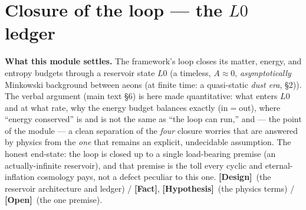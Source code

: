 \documentclass[11pt]{article}
\newcommand{\Fact}{\textbf{\textcolor{green!45!black}{[Fact]}}}
\newcommand{\Hyp}{\textbf{\textcolor{blue!55!black}{[Hypothesis]}}}
\newcommand{\Design}{\textbf{\textcolor{purple!65!black}{[Design]}}}
\newcommand{\Open}{\textbf{\textcolor{gray!10!black}{[Open]}}}
\begin{document}
\clearpage

\part{Closure of the loop --- the $L0$ ledger}
\setcounter{section}{0}\setcounter{equation}{0}\setcounter{figure}{0}

\noindent\textbf{What this module settles.} The framework's loop closes its matter, energy, and entropy budgets through a reservoir state $L0$ (a timeless, $A\!\approx\!0$, \emph{asymptotically} Minkowski background between aeons (at finite time: a quasi-static \emph{dust era}, \S2)). The verbal argument (main text \S6) is here made quantitative: what enters $L0$ and at what rate, why the energy budget balances exactly (in$=$out), where ``energy conserved'' is and is not the same as ``the loop can run,'' and --- the point of the module --- a clean separation of the \emph{four} closure worries that are answered by physics from the \emph{one} that remains an explicit, undecidable assumption. The honest end-state: the loop is closed up to a single load-bearing premise (an actually-infinite reservoir), and that premise is the toll every cyclic and eternal-inflation cosmology pays, not a defect peculiar to this one. \Design\ (the reservoir architecture and ledger) / \Fact, \Hyp\ (the physics terms) / \Open\ (the one premise).
\end{document}
